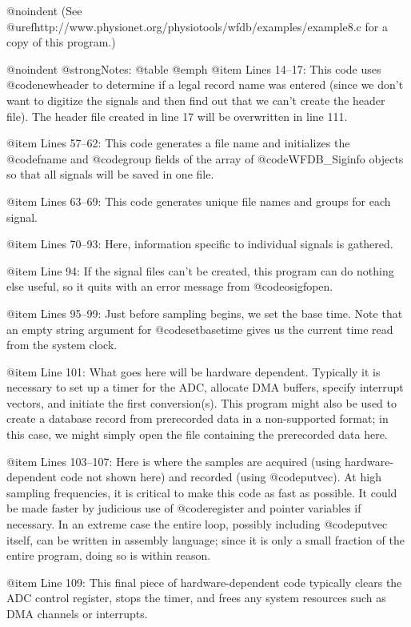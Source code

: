 {{{{{{{{{{@noindent
(See @uref{http://www.physionet.org/physiotools/wfdb/examples/example8.c}
for a copy of this program.)

@noindent
@strong{Notes:}
@table @emph
@item Lines 14--17:
This code uses @code{newheader} to determine if a legal record name was
entered (since we don't want to digitize the signals and then find out
that we can't create the header file).  The header file
created in line 17 will be overwritten in line 111.

@item Lines 57--62:
This code generates a file name and initializes the @code{fname} and
@code{group} fields of the array of @code{WFDB_Siginfo} objects so that all
signals will be saved in one file.

@item Lines 63--69:
This code generates unique file names and groups for each signal.

@item Lines 70--93:
Here, information specific to individual signals is gathered.

@item Line 94:
If the signal files can't be created, this program can do nothing else
useful, so it quits with an error message from @code{osigfopen}.

@item Lines 95--99:
Just before sampling begins, we set the base time.  Note that an empty
string argument for @code{setbasetime} gives us the current time read from
the system clock.

@item Line 101:
What goes here will be hardware dependent.  Typically it is necessary to
set up a timer for the ADC, allocate DMA buffers, specify interrupt vectors,
and initiate the first conversion(s).  This program might also be used to
create a database record from prerecorded data in a non-supported format;
in this case, we might simply open the file containing the prerecorded data
here.

@item Lines 103--107:
Here is where the samples are acquired (using hardware-dependent code
not shown here) and recorded (using @code{putvec}).  At high sampling
frequencies, it is critical to make this code as fast as possible.  It
could be made faster by judicious use of @code{register} and pointer
variables if necessary.  In an extreme case the entire loop, possibly
including @code{putvec} itself, can be written in assembly language;
since it is only a small fraction of the entire program, doing so is
within reason.

@item Line 109:
This final piece of hardware-dependent code typically clears the ADC
control register, stops the timer, and frees any system resources such as
DMA channels or interrupts.

}}}}}}}}}}
